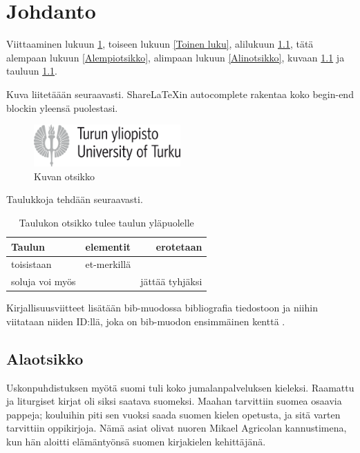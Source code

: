 \chapter{Johdanto}
\label{Johdanto}

Viittaaminen lukuun \ref{Johdanto}, toiseen lukuun \ref{Toinen luku}, alilukuun \ref{Alaotsikko}, tätä alempaan lukuun \ref{Alempiotsikko}, alimpaan lukuun \ref{Alinotsikko}, kuvaan \ref{Kuva esimerkki} ja tauluun \ref{Taulu esimerkki}.

Kuva liitetäään seuraavasti. ShareLaTeXin autocomplete rakentaa koko begin-end blockin yleensä puolestasi.

\begin{figure}
\centering
\includegraphics[width=0.5\textwidth]{kuvat/turun_yliopisto_logo_rgb.png}
\caption{Kuvan otsikko}
\label{Kuva esimerkki}
\end{figure}

Taulukkoja tehdään seuraavasti.

\begin{table}
\centering
\caption{Taulukon otsikko tulee taulun yläpuolelle}
\begin{tabular}{l|c|r|}
 Taulun             &   elementit   & erotetaan \\
 \hline
 toisistaan         &   et-merkillä & \\
 soluja voi myös    &               & jättää tyhjäksi
\end{tabular}
\label{Taulu esimerkki}
\end{table}

Kirjallisuusviitteet lisätään bib-muodossa bibliografia tiedostoon ja niihin viitataan niiden ID:llä, joka on bib-muodon ensimmäinen kenttä \cite{crawley2007write}.

\section{Alaotsikko}
\label{Alaotsikko}

Uskonpuhdistuksen myötä suomi tuli koko jumalanpalveluksen kieleksi. Raamattu ja liturgiset kirjat oli siksi saatava suomeksi. Maahan tarvittiin suomea osaavia pappeja; kouluihin piti sen vuoksi saada suomen kielen opetusta, ja sitä varten tarvittiin oppikirjoja. Nämä asiat olivat nuoren Mikael Agricolan kannustimena, kun hän aloitti elämäntyönsä suomen kirjakielen kehittäjänä.

